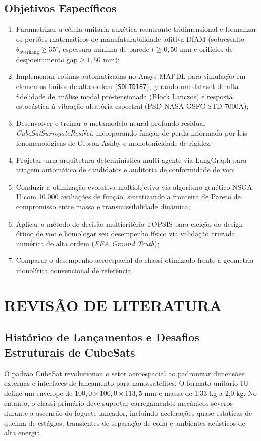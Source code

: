 \documentclass[12pt,a4paper]{report}
\begin{document}
\section{Objetivos Específicos}
\begin{enumerate}
    \item Parametrizar a célula unitária auxética reentrante tridimensional e formalizar os portões matemáticos de manufaturabilidade aditiva DfAM (sobressalto $\theta_{\text{overhang}} \ge 35^\circ$, espessura mínima de parede $t \ge 0{,}50\text{ mm}$ e orifícios de despoeiramento $\text{gap} \ge 1{,}50\text{ mm}$);
    \item Implementar rotinas automatizadas no Ansys MAPDL para simulação em elementos finitos de alta ordem (\texttt{SOLID187}), gerando um dataset de alta fidelidade de análise modal pré-tensionada (Block Lanczos) e resposta estocástica à vibração aleatória espectral (PSD NASA GSFC-STD-7000A);
    \item Desenvolver e treinar o metamodelo neural profundo residual \textit{CubeSatSurrogateResNet}, incorporando função de perda informada por leis fenomenológicas de Gibson-Ashby e monotonicidade de rigidez;
    \item Projetar uma arquitetura determinística multi-agente via LangGraph para triagem automática de candidatos e auditoria de conformidade de voo;
    \item Conduzir a otimização evolutiva multiobjetivo via algoritmo genético NSGA-II com 10.000 avaliações de função, sintetizando a fronteira de Pareto de compromisso entre massa e transmissibilidade dinâmica;
    \item Aplicar o método de decisão multicritério TOPSIS para eleição do design ótimo de voo e homologar seu desempenho físico via validação cruzada numérica de alta ordem (\textit{FEA Ground Truth});
    \item Comparar o desempenho aeroespacial do chassi otimizado frente à geometria monolítica convencional de referência.
\end{enumerate}

\chapter{REVISÃO DE LITERATURA}

\section{Histórico de Lançamentos e Desafios Estruturais de CubeSats}
O padrão CubeSat revolucionou o setor aeroespacial ao padronizar dimensões externas e interfaces de lançamento para nanossatélites. O formato unitário 1U define um envelope de $100{,}0 \times 100{,}0 \times 113{,}5\text{ mm}$ e massa de 1,33 kg a 2,0 kg. No entanto, o chassi primário deve suportar carregamentos mecânicos severos durante a ascensão do foguete lançador, incluindo acelerações quase-estáticas de queima de estágios, transientes de separação de coifa e ambientes acústicos de alta energia.
\end{document}
